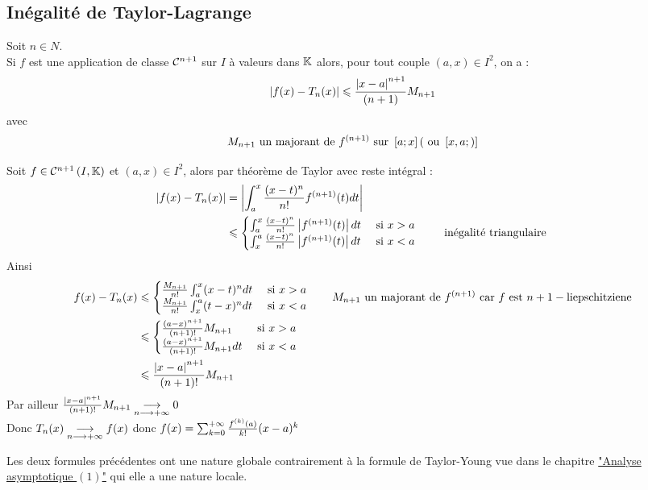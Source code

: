 \subsection{Inégalité de Taylor-Lagrange}
\begin{defprop}
    Soit \(n \in  N\).\\
    Si \(f\) est une application de classe \(\cal{C}^{n+1}\) sur \(I\) à valeurs dans \(\K\) alors, pour tout couple \((a, x) \in  I^2\), on a :
    \[\abs{f (x) -  T_n(x)} \leq \frac{\abs{x -  a}^{n+1}}{(n + 1)}M_{n+1}\]
    avec
    \[M_{n+1} \text{ un majorant de }f^{(n+1)} \text{ sur } \intervii{a}{x} (\text{ ou } \intervii{x, a})\]
\end{defprop}
\begin{dem}
    Soit \(f \in \cal{C}^{n+1}\paren{I,\K}\) et \((a,x) \in I^2\), alors par théorème de Taylor avec reste intégral : \\
    \[\begin{aligned}
        \abs{f(x) - T_n(x)} &= \abs{\int^x_a \frac{(x -  t)^n}{n!} f^{(n+1)}(t) dt }\\
        &\leq \begin{cases}
        \int^x_a \frac{(x -  t)^n}{n!} \abs{f^{(n+1)}(t)} dt &\text{ si } x>a \\
        \int_x^a \frac{(x -  t)^n}{n!} \abs{f^{(n+1)}(t)} dt &\text{ si } x<a
        \end{cases} \qquad \text{ inégalité triangulaire }
    \end{aligned}\]
    Ainsi \[\begin{aligned}
        f(x) - T_n(x) &\leq\begin{cases}
        \frac{M_{n+1}}{n!}\int^x_a (x -  t)^n  dt &\text{ si } x>a \\
        \frac{M_{n+1}}{n!}\int_x^a (t - x)^n dt &\text{ si } x<a
        \end{cases} \qquad  M_{n+1} \text{ un majorant de } f^{(n+1)} \text{ car } f \text{ est } n+1-\text{liepschitziene} \\
        &\leq \begin{cases}
        \frac{(a-x)^{n+1}}{(n+1)!}  M_{n+1} &\text{ si } x>a \\
        \frac{(a-x)^{n+1}}{(n+1)!} M_{n+1} dt &\text{ si } x<a
        \end{cases}\\
        &\leq \frac{\abs{x-a}^{n+1}}{(n+1)!} M_{n+1}
    \end{aligned}\]
    Par ailleur \(\frac{\abs{x-a}^{n+1}}{(n+1)!} M_{n+1} \underset{n \to \pinf}{\to} 0\)\\
    Donc \(T_n(x) \underset{n \to \pinf}{\to} f(x)\) donc \(f(x) = \sum_{k=0}^{\pinf} \frac{f^{(k)}(a)}{k!} (x-a)^k\)
\end{dem}
\begin{defprop}[Remarque]
Les deux formules précédentes ont une nature globale contrairement à la formule de Taylor-Young vue dans le chapitre \hyperref[chap:analyse-asymptotique1]{"Analyse asymptotique \((1)\)"} qui elle a une nature locale.
\end{defprop}